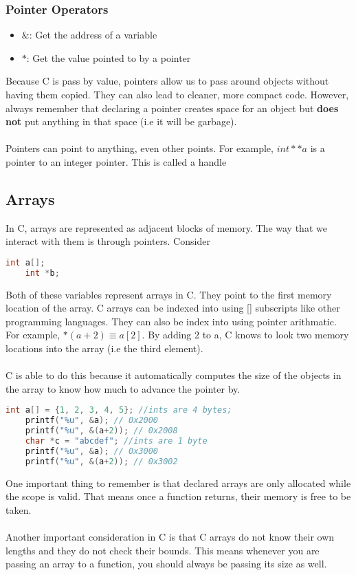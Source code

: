 \documentclass{article}
\begin{document}
\subsubsection{Pointer Operators}
\begin{itemize}
    \item $\&$: Get the address of a variable
    \item $*$: Get the value pointed to by a pointer
\end{itemize}
Because C is pass by value, pointers allow us to pass around objects without having them copied.
They can also lead to cleaner, more compact code. However, always remember that declaring a pointer
creates space for an object but \textbf{does not} put anything in that space (i.e it will be garbage).\\\\
Pointers can point to anything, even other points. For example, $int **a$ is a pointer to an integer pointer. 
This is called a handle
\subsection{Arrays}
In C, arrays are represented as adjacent blocks of memory. The way that we interact with them is through pointers.
Consider
\begin{lstlisting}[language=C]
    int a[];
    int *b;
\end{lstlisting}
Both of these variables represent arrays in C. They point to the first memory location of the array.
C arrays can be indexed into using [] subscripts like other programming languages. They can also be
index into using pointer arithmatic. For example, $*(a+2) \equiv a[2]$. By adding 2 to a, C knows to 
look two memory locations into the array (i.e the third element).\\\\
C is able to do this because it automatically computes the size of the objects in the array to know how
much to advance the pointer by.
\begin{lstlisting}[language=C]
    int a[] = {1, 2, 3, 4, 5}; //ints are 4 bytes;
    printf("%u", &a); // 0x2000
    printf("%u", &(a+2)); // 0x2008
    char *c = "abcdef"; //ints are 1 byte
    printf("%u", &a); // 0x3000
    printf("%u", &(a+2)); // 0x3002
\end{lstlisting}
One important thing to remember is that declared arrays are only allocated while the scope is valid.
That means once a function returns, their memory is free to be taken.\\\\
Another important consideration in C is that C arrays do not know their own lengths and they do not check their bounds.
This means whenever you are passing an array to a function, you should always be passing its size as well.
\end{document}
